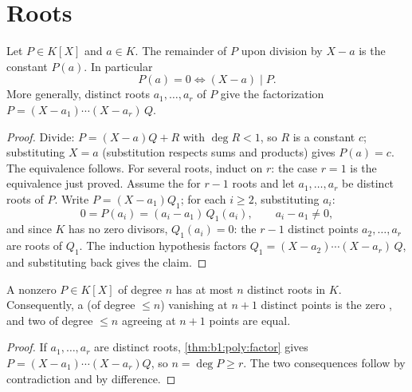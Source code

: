 \section{Roots}

\begin{theorem}\label{thm:b1:poly:factor}
Let $P \in K[X]$ and $a \in K$. The remainder of $P$ upon division by
$X - a$ is the constant $P(a)$. In particular
\[
P(a) = 0 \iff (X - a) \mid P .
\]
More generally, distinct roots $a_1, \dots, a_r$ of $P$ give the
factorization $P = (X - a_1)\cdots(X - a_r)\, Q$.
\end{theorem}

\begin{proof}
Divide: $P = (X - a) Q + R$ with $\deg R < 1$, so $R$ is a constant
$c$; substituting $X = a$ (substitution respects sums and products)
gives $P(a) = c$. The equivalence follows. For several roots,
induct on $r$: the case $r = 1$ is the equivalence just proved.
Assume the  for $r - 1$ roots and let $a_1, \dots, a_r$
be distinct roots of $P$. Write $P = (X - a_1)Q_1$; for each $i
\geq 2$, substituting $a_i$:
\[
0 = P(a_i) = (a_i - a_1)\,Q_1(a_i),
\qquad a_i - a_1 \neq 0 ,
\]
and since $K$ has no zero divisors, $Q_1(a_i) = 0$: the $r - 1$
distinct points $a_2, \dots, a_r$ are roots of $Q_1$. The
induction hypothesis factors $Q_1 = (X - a_2)\cdots(X - a_r)\,Q$,
and substituting back gives the claim.
\end{proof}

\begin{corollary}\label{cor:b1:poly:nroots}
A nonzero $P \in K[X]$ of degree $n$ has at most $n$ distinct roots
in $K$. Consequently, a  (of degree $\leq n$) vanishing at
$n + 1$ distinct points is the zero , and two 
of degree $\leq n$ agreeing at $n+1$ points are equal.
\end{corollary}

\begin{proof}
If $a_1, \dots, a_r$ are distinct roots, \cref{thm:b1:poly:factor}
gives $P = (X-a_1)\cdots(X-a_r) Q$, so $n = \deg P \geq r$. The two
consequences follow by contradiction and by difference.
\end{proof}

